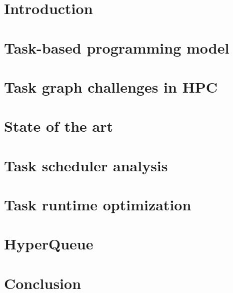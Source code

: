 \documentclass[english,phd]{diploma}
\begin{document}
\MakeTitlePages

\listoffigures
\clearpage

\listoftables
\clearpage

\chapter{Introduction}
\label{ch:Introduction}


\chapter{Task-based programming model}
\label{ch:taskgraphs}


\chapter{Task graph challenges in HPC}
\label{ch:challenges}


\chapter{State of the art}
\label{ch:sota}


\chapter{Task scheduler analysis}
\label{ch:estee}


\chapter{Task runtime optimization}
\label{ch:rsds}


\chapter{HyperQueue}
\label{ch:hyperqueue}


\chapter{Conclusion}
\label{ch:conclusion}




\appendix
\end{document}
